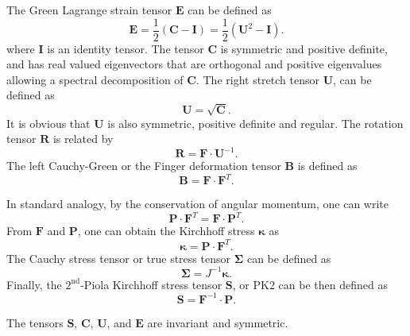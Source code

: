 The Green Lagrange strain tensor $ \textbf{E} $ can be defined as 
\begin{equation}\label{app-kine-8}
\textbf{E}=\frac{1}{2}(\textbf{C}-\textbf{I})=\frac{1}{2}(\textbf{U}^2-\textbf{I}).
\end{equation}
where $ \textbf{I} $ is an identity tensor. The tensor $ \textbf{C} $ is symmetric and positive definite, and has real valued eigenvectors that are orthogonal and positive eigenvalues allowing a spectral decomposition of $ \textbf{C} $.
The right stretch tensor $ \textbf{U} $, can be defined as
\begin{equation}\label{app-kine-7}
\textbf{U}=\sqrt{\textbf{C}}.
\end{equation}
It is obvious that $ \textbf{U} $ is also symmetric, positive definite and regular. The rotation tensor $ \textbf{R} $ is related by 
\begin{equation}\label{app-kine-7-1}
\textbf{R}=\textbf{F}\cdot\textbf{U}^{-1}.
\end{equation}
The left Cauchy-Green or the Finger deformation tensor $ \textbf{B} $ is defined as
\begin{equation}\label{app-kine-7-2}
\textbf{B}=\textbf{F}\cdot\textbf{F}^T.
\end{equation}

In standard analogy, by the conservation of angular momentum, one can write
\begin{equation}\label{app-kine-2}
\textbf{P}\cdot\textbf{F}^T=\textbf{F}\cdot\textbf{P}^T.
\end{equation}
From $ \textbf{F} $ and $ \textbf{P} $, one can obtain the Kirchhoff stress $ \boldsymbol\kappa $ as
\begin{equation}\label{app-kine-3}
\boldsymbol\kappa=\textbf{P}\cdot\textbf{F}^T.
\end{equation}
The Cauchy stress tensor or true stress tensor $ \bm\Sigma $ can be defined as 
\begin{equation}\label{app-kine-4}
\bm\Sigma=J^{-1}\boldsymbol\kappa.
\end{equation}
Finally, the $ 2^\text{nd} $-Piola Kirchhoff stress tensor $ \textbf{S} $, or PK2 can be then defined as
\begin{equation}\label{app-kine-5}
\textbf{S}=\textbf{F}^{-1}\cdot\textbf{P}.
\end{equation}

The tensors $ \textbf{S} $, $ \textbf{C} $, $ \textbf{U} $, and $ \textbf{E} $ are invariant and symmetric. 


